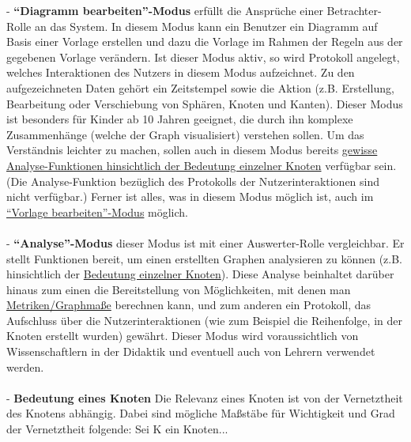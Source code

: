 \documentclass[enabledeprecatedfontcommands,fontsize=11pt,paper=a4,twoside]{scrartcl}
\newcounter{one}
\begin{document}
- \textbf{\hypertarget{``Diagramm bearbeiten''-Modus}{``Diagramm bearbeiten''-Modus}} erfüllt die Ansprüche einer Betrachter-Rolle an das System. In diesem Modus kann ein Benutzer ein Diagramm auf Basis einer Vorlage erstellen und dazu die Vorlage im Rahmen der Regeln aus der gegebenen Vorlage verändern. Ist dieser Modus aktiv, so wird Protokoll angelegt, welches Interaktionen des Nutzers in diesem Modus aufzeichnet. Zu den aufgezeichneten Daten gehört ein Zeitstempel sowie die Aktion (z.B. Erstellung, Bearbeitung oder Verschiebung von Sphären, Knoten und Kanten). Dieser Modus ist besonders für Kinder ab 10 Jahren geeignet, die durch ihn komplexe Zusammenhänge (welche der Graph visualisiert) verstehen sollen. Um das Verständnis leichter zu machen, sollen auch in diesem Modus bereits \hyperlink{Bedeutung eines Knoten}{gewisse Analyse-Funktionen hinsichtlich der Bedeutung einzelner Knoten} verfügbar sein. (Die Analyse-Funktion bezüglich des Protokolls der Nutzerinteraktionen sind nicht verfügbar.) Ferner ist alles, was in diesem Modus möglich ist, auch im \hyperlink{``Vorlage bearbeiten''-Modus}{``Vorlage bearbeiten''-Modus} möglich.\\ \\
- \textbf{\hypertarget{``Analyse''-Modus}{``Analyse''-Modus}} dieser Modus ist mit einer Auswerter-Rolle vergleichbar. Er stellt Funktionen bereit, um einen erstellten Graphen analysieren zu können (z.B. hinsichtlich der \hyperlink{Bedeutung eines Knoten}{Bedeutung einzelner Knoten}). Diese Analyse beinhaltet darüber hinaus zum einen die Bereitstellung von Möglichkeiten, mit denen man \hyperlink{Metriken/Graphmaße}{Metriken/Graphmaße} berechnen kann, und zum anderen ein Protokoll, das Aufschluss über die Nutzerinteraktionen (wie zum Beispiel die Reihenfolge, in der Knoten erstellt wurden) gewährt. Dieser Modus wird voraussichtlich von Wissenschaftlern in der Didaktik und eventuell auch von Lehrern verwendet werden. \\ \\
- \textbf{\hypertarget{Bedeutung eines Knoten}{Bedeutung eines Knoten}} Die Relevanz eines Knoten ist von der Vernetztheit des Knotens abhängig. Dabei sind mögliche Maßstäbe für Wichtigkeit und Grad der Vernetztheit folgende: Sei K ein Knoten... \\
\newpage
\end{document}
